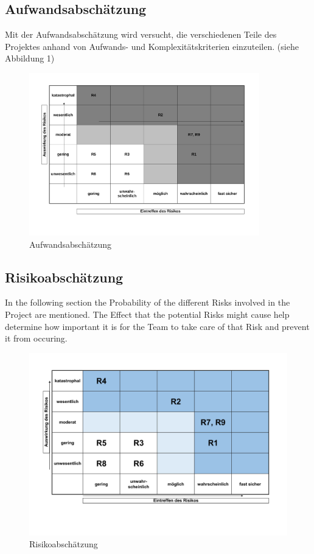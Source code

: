 \subsection{Aufwandsabschätzung}
Mit der Aufwandsabschätzung wird versucht, die verschiedenen Teile des Projektes anhand von Aufwands- und Komplexitätskriterien einzuteilen. (siehe Abbildung 1)
\clearpage
\begin{figure}
	\begin{center}
		\includegraphics[width= 10cm]{figures/Aufwandsabschaetzung.pdf}
		\caption{Aufwandsabschätzung}
	\end{center}
\end{figure}

\subsection{Risikoabschätzung}
In the following section the Probability of the different Risks involved in the Project are mentioned. The Effect that the potential Risks might cause help determine how important it is for the Team to take care of that Risk and prevent it from occuring.

\begin{figure}
	\begin{center}
		\includegraphics[width= 17cm]{figures/Risikoabschaetzung.pdf}
		\caption{Risikoabschätzung}
	\end{center}
\end{figure}


